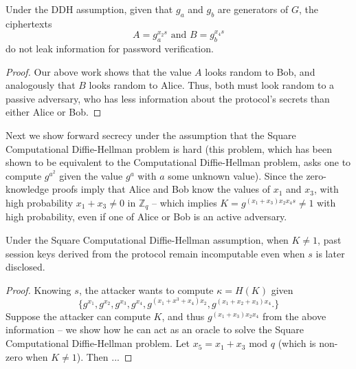 \begin{theorem} Under the DDH assumption, given that $g_a$ and $g_b$ are generators of $G$, the ciphertexts 
 \[ A = g_a^{x_2s} \text{ and } B = g_b^{x_4s} \]
do not leak information for password verification.
\end{theorem}
\begin{proof}
Our above work shows that the value $A$ looks random to Bob, and analogously that $B$ looks random to Alice.  Thus, both must look random
to a passive adversary, who has less information about the protocol's secrets than either Alice or Bob.
\end{proof}

Next we show forward secrecy under the assumption that the Square Computational Diffie-Hellman problem is hard (this problem, which has been shown to be equivalent to the Computational Diffie-Hellman problem, asks one to compute $g^{a^2}$ given the value $g^a$ with $a$ some unknown value).  Since the zero-knowledge proofs imply that Alice and Bob know the values of $x_1$ and $x_3$, with high probability $x_1+x_3 \neq 0$ in $\mathbb{Z}_q$ -- which implies $K = g^{(x_1+x_3)x_2x_4s} \neq 1$ with high probability, even if one of Alice or Bob is an active adversary.

\begin{theorem}
Under the Square Computational Diffie-Hellman assumption, when $K \neq 1$, past session keys derived from the protocol remain incomputable even when $s$ is later disclosed.
\end{theorem}
\begin{proof}
Knowing $s$, the attacker wants to compute $\kappa = H(K)$ given
\[ \{g^{x_1},g^{x_2},g^{x_3},g^{x_4},g^{(x_1+x^3+x_4)x_2}, g^{(x_1+x_2+x_3)x_4}. \} \]
Suppose the attacker can compute $K$, and thus $g^{(x_1+x_3)x_2x_4}$ from the above information -- we show how he can act as an oracle to solve the
Square Computational Diffie-Hellman problem.  Let $x_5 = x_1+x_3$ mod $q$ (which is non-zero when $K \neq 1$).  Then ...
\end{proof}




